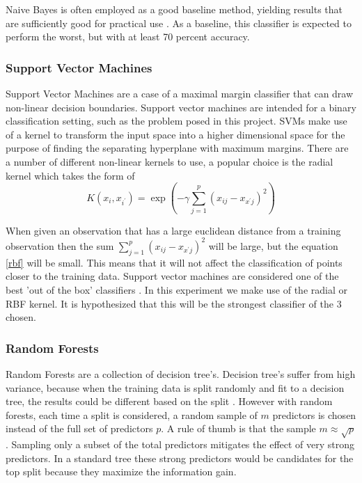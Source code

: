 \documentclass[10pt,letterpaper]{article}
\begin{document}
	Naive Bayes is often employed as a good baseline method, yielding results that are sufficiently good for practical use \cite{jurafsky}. As a baseline, this classifier is expected to perform the worst, but with at least 70 percent accuracy.
	
	\subsubsection*{Support Vector Machines}
	
	Support Vector Machines are a case of a maximal margin classifier that can draw non-linear decision boundaries. Support vector machines are intended for a binary classification setting, such as the problem posed in this project. SVMs make use of a kernel to transform the input space into a higher dimensional space for the purpose of finding the separating hyperplane with maximum margins. There are a number of different non-linear kernels to use, a popular choice is the radial kernel \cite{yellowbook} which takes the form of 
	\begin{equation}
	\label{rbf}
	K(x_i, x_{i^\prime}) = \exp({-\gamma \sum_{j=1}^{p}({x_{ij}-x_{x^\prime j}})^2})
	\end{equation}
	
	When given an observation that has a large euclidean distance from a training observation then the sum $\sum_{j=1}^{p}({x_{ij}-x_{x^\prime j}})^2$ will be large, but the equation \ref{rbf} will be small. This means that it will not affect the classification of points closer to the training data. Support vector machines are considered one of the best 'out of the box' classifiers \cite{yellowbook}. In this experiment we make use of the radial or RBF kernel. It is hypothesized that this will be the strongest classifier of the 3 chosen. 
	
	\subsubsection*{Random Forests}
	Random Forests are a collection of decision tree's. Decision tree's suffer from high variance, because when the training data is split randomly and fit to a decision tree, the results could be different based on the split \cite{yellowbook}. However with random forests, each time a split is considered, a random sample of $m$ predictors is chosen instead of the full set of predictors $p$. A rule of thumb is that the sample $m \approx \sqrt{p}$ \cite{yellowbook}. Sampling only a subset of the total predictors mitigates the effect of very strong predictors. In a standard tree these strong predictors would be candidates for the top split because they maximize the information gain. 
	
\end{document}
